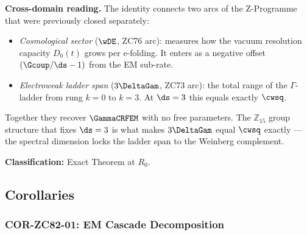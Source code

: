 \documentclass[12pt, a4paper]{article}
\begin{document}
\begin{formalbox}[title={THM-ZC82-01: Cosmological-Ladder Identity
  ($R_0$, Exact)}]
\textbf{Cross-domain reading.}
The identity connects two arcs of the Z-Programme that were
previously closed separately:
\begin{itemize}[leftmargin=2em, noitemsep]
  \item \emph{Cosmological sector} ($\wDE$, ZC76 arc):
    measures how the vacuum resolution capacity $D_0(t)$ grows
    per e-folding. It enters as a negative offset
    $(\Gcoup/\ds - 1)$ from the EM sub-rate.
  \item \emph{Electroweak ladder span} ($3\DeltaGam$, ZC73 arc):
    the total range of the $\Gamma$-ladder from rung $k=0$ to
    $k=3$. At $\ds = 3$ this equals exactly $\cwsq$.
\end{itemize}
Together they recover $\GammaCRFEM$ with no free parameters.
The $\mathbb{Z}_{15}$ group structure that fixes $\ds = 3$ is
what makes $3\DeltaGam$ equal $\cwsq$ exactly --- the spectral
dimension locks the ladder span to the Weinberg complement.

\textbf{Classification:} Exact Theorem at $R_0$.
\end{formalbox}

\subsection{Corollaries}
\label{sec:cors}

\subsubsection{COR-ZC82-01: EM Cascade Decomposition}
\label{sec:cor01}
\end{document}
